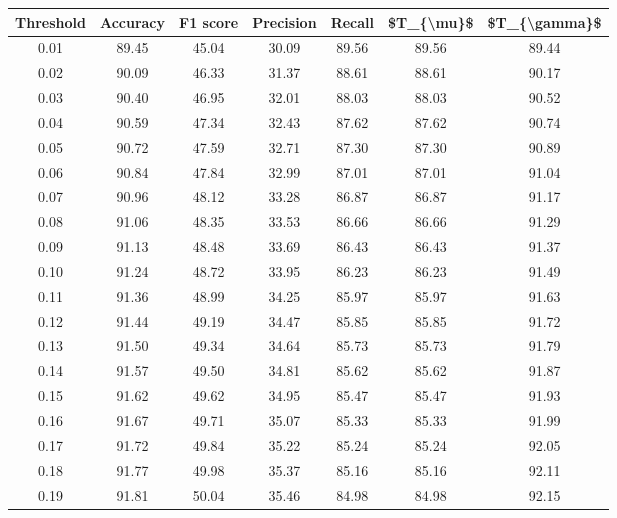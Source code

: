 \begin{tabular}{|c|c|c|c|c|c|c|}
\hline
 Threshold &  Accuracy &  F1 score &  Precision &  Recall &  \$T\_\{\textbackslash mu\}\$ &  \$T\_\{\textbackslash gamma\}\$ \\
\hline
      0.01 &     89.45 &     45.04 &      30.09 &   89.56 &      89.56 &         89.44 \\
      0.02 &     90.09 &     46.33 &      31.37 &   88.61 &      88.61 &         90.17 \\
      0.03 &     90.40 &     46.95 &      32.01 &   88.03 &      88.03 &         90.52 \\
      0.04 &     90.59 &     47.34 &      32.43 &   87.62 &      87.62 &         90.74 \\
      0.05 &     90.72 &     47.59 &      32.71 &   87.30 &      87.30 &         90.89 \\
      0.06 &     90.84 &     47.84 &      32.99 &   87.01 &      87.01 &         91.04 \\
      0.07 &     90.96 &     48.12 &      33.28 &   86.87 &      86.87 &         91.17 \\
      0.08 &     91.06 &     48.35 &      33.53 &   86.66 &      86.66 &         91.29 \\
      0.09 &     91.13 &     48.48 &      33.69 &   86.43 &      86.43 &         91.37 \\
      0.10 &     91.24 &     48.72 &      33.95 &   86.23 &      86.23 &         91.49 \\
      0.11 &     91.36 &     48.99 &      34.25 &   85.97 &      85.97 &         91.63 \\
      0.12 &     91.44 &     49.19 &      34.47 &   85.85 &      85.85 &         91.72 \\
      0.13 &     91.50 &     49.34 &      34.64 &   85.73 &      85.73 &         91.79 \\
      0.14 &     91.57 &     49.50 &      34.81 &   85.62 &      85.62 &         91.87 \\
      0.15 &     91.62 &     49.62 &      34.95 &   85.47 &      85.47 &         91.93 \\
      0.16 &     91.67 &     49.71 &      35.07 &   85.33 &      85.33 &         91.99 \\
      0.17 &     91.72 &     49.84 &      35.22 &   85.24 &      85.24 &         92.05 \\
      0.18 &     91.77 &     49.98 &      35.37 &   85.16 &      85.16 &         92.11 \\
      0.19 &     91.81 &     50.04 &      35.46 &   84.98 &      84.98 &         92.15 \\

\end{tabular}
